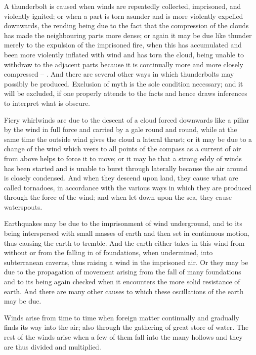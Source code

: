 \documentclass{stex}
\begin{document}
A thunderbolt is caused when winds are repeatedly collected, imprisoned, and violently ignited; or when a part is torn asunder and is more violently expelled downwards, the rending being due to the fact that the compression of the clouds has made the neighbouring parts more dense; or again it may be due like thunder merely to the expulsion of the imprisoned fire, when this has accumulated and been more violently inflated with wind and has torn the cloud, being unable to withdraw to the adjacent parts because it is continually more and more closely compressed – .
And there are several other ways in which thunderbolts may possibly be produced.
Exclusion of myth is the sole condition necessary; and it will be excluded, if one properly attends to the facts and hence draws inferences to interpret what is obscure.

Fiery whirlwinds are due to the descent of a cloud forced downwards like a pillar by the wind in full force and carried by a gale round and round, while at the same time the outside wind gives the cloud a lateral thrust; or it may be due to a change of the wind which veers to all points of the compass as a current of air from above helps to force it to move; or it may be that a strong eddy of winds has been started and is unable to burst through laterally because the air around is closely condensed.
And when they descend upon land, they cause what are called tornadoes, in accordance with the various ways in which they are produced through the force of the wind; and when let down upon the sea, they cause waterspouts.

Earthquakes may be due to the imprisonment of wind underground, and to its being interspersed with small masses of earth and then set in continuous motion, thus causing the earth to tremble.
And the earth either takes in this wind from without or from the falling in of foundations, when undermined, into subterranean caverns, thus raising a wind in the imprisoned air.
Or they may be due to the propagation of movement arising from the fall of many foundations and to its being again checked when it encounters the more solid resistance of earth.
And there are many other causes to which these oscillations of the earth may be due.

Winds arise from time to time when foreign matter continually and gradually finds its way into the air; also through the gathering of great store of water.
The rest of the winds arise when a few of them fall into the many hollows and they are thus divided and multiplied.
\end{document}
